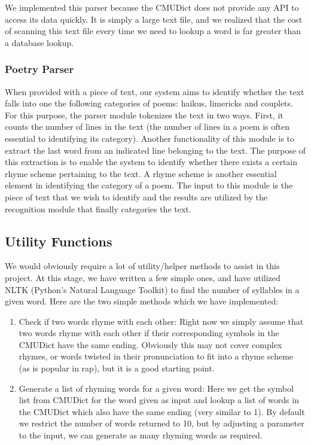 \documentclass[10pt, letter]{article}
\begin{document}
We implemented this parser because the CMUDict does not provide any API to access its data quickly. It is simply a large text file, and we realized that the cost of scanning this text file every time we need to lookup a word is far greater than a database lookup.
\subsubsection*{Poetry Parser}
When provided with a piece of text, our system aims to identify whether the text falls into one the following categories of poems: haikus, limericks and couplets. For this purpose, the parser module tokenizes the text in two ways. First, it counts the number of lines in the text (the number of lines in a poem is often essential to identifying its category). Another functionality of this module is to extract the last word from an indicated line belonging to the text. The purpose of this extraction is to enable the system to identify whether there exists a certain rhyme scheme pertaining to the text. A rhyme scheme is another essential element in identifying the category of a poem. The input to this module is the piece of text that we wish to identify and the results are utilized by the recognition module that finally categories the text.

\subsection*{Utility Functions}
We would obviously require a lot of utility/helper methods to assist in this project. At this stage, we have written a few simple ones, and have utilized NLTK (Python’s Natural Language Toolkit)\cite{bird2009natural} to find the number of syllables in a given word. Here are the two simple methods which we have implemented:
\begin{enumerate}
    \item Check if two words rhyme with each other: Right now we simply assume that two words rhyme with each other if their corresponding symbols in the CMUDict have the same ending. Obviously this may not cover complex rhymes, or words twisted in their pronunciation to fit into a rhyme scheme (as is popular in rap), but it is a good starting point.
    \item Generate a list of rhyming words for a given word: Here we get the symbol list from CMUDict for the word given as input and lookup a list of words in the CMUDict which also have the same ending (very similar to 1). By default we restrict the number of words returned to 10, but by adjusting a parameter to the input, we can generate as many rhyming words as required.
\end{enumerate}
\end{document}
